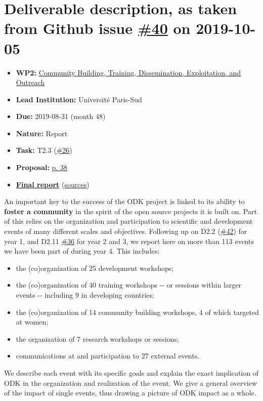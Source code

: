 \hypertarget{deliverable-description-as-taken-from-github-issue-40-on-2019-10-05}{%
\section*{\texorpdfstring{Deliverable description, as taken from Github
issue
\href{https://github.com/OpenDreamKit/OpenDreamKit/issues/40}{\#40} on
2019-10-05}{Deliverable description, as taken from Github issue \#40 on 2019-10-05}}\label{deliverable-description-as-taken-from-github-issue-40-on-2019-10-05}}

\begin{itemize}
\tightlist
\item
  \textbf{WP2:}
  \href{https://github.com/OpenDreamKit/OpenDreamKit/tree/master/WP2}{Community
  Building, Training, Dissemination, Exploitation, and Outreach}
\item
  \textbf{Lead Institution:} Université Paris-Sud
\item
  \textbf{Due:} 2019-08-31 (month 48)
\item
  \textbf{Nature:} Report
\item
  \textbf{Task:} T2.3
  (\href{https://github.com/OpenDreamKit/OpenDreamKit/issues/26}{\#26})
\item
  \textbf{Proposal:}
  \href{https://github.com/OpenDreamKit/OpenDreamKit/raw/master/Proposal/proposal-www.pdf}{p.
  38}
\item
  \textbf{\href{https://github.com/OpenDreamKit/OpenDreamKit/raw/master/WP2/D2.15/report-final.pdf}{Final
  report}}
  (\href{https://github.com/OpenDreamKit/OpenDreamKit/raw/master/WP2/D2.15/}{sources})
\end{itemize}

An important key to the success of the ODK project is linked to its
ability to \textbf{foster a community} in the spirit of the open source
projects it is built on. Part of this relies on the organization and
participation to scientific and development events of many different
scales and objectives. Following up on D2.2
(\href{https://github.com/OpenDreamKit/OpenDreamKit/issues/42}{\#42})
for year 1, and D2.11
\href{https://github.com/OpenDreamKit/OpenDreamKit/issues/36}{\#36} for
year 2 and 3, we report here on more than 113 events we have been part
of during year 4. This includes:

\begin{itemize}
\tightlist
\item
  the (co)organization of 25 development workshops;
\item
  the (co)organization of 40 training workshops -\/- or sessions within
  larger events -\/- including 9 in developing countries;
\item
  the (co)organization of 14 community building workshops, 4 of which
  targeted at women;
\item
  the organization of 7 research workshops or sessions;
\item
  communications at and participation to 27 external events.
\end{itemize}

We describe each event with its specific goals and explain the exact
implication of ODK in the organization and realization of the event. We
give a general overview of the impact of single events, thus drawing a
picture of ODK impact as a whole.
